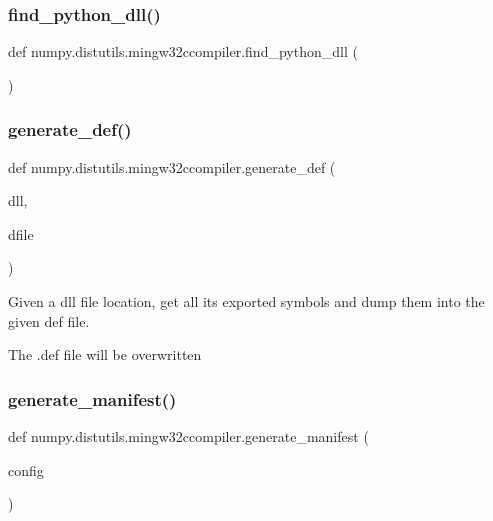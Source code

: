 \subsubsection{\texorpdfstring{find\+\_\+python\+\_\+dll()}{find\_python\_dll()}}
{\footnotesize\ttfamily def numpy.\+distutils.\+mingw32ccompiler.\+find\+\_\+python\+\_\+dll (\begin{DoxyParamCaption}{ }\end{DoxyParamCaption})}

\mbox{\label{namespacenumpy_1_1distutils_1_1mingw32ccompiler_a3ddd00e2fbe0eceeaa6fa2921a6feba0}} 
\subsubsection{\texorpdfstring{generate\+\_\+def()}{generate\_def()}}
{\footnotesize\ttfamily def numpy.\+distutils.\+mingw32ccompiler.\+generate\+\_\+def (\begin{DoxyParamCaption}\item[{}]{dll,  }\item[{}]{dfile }\end{DoxyParamCaption})}

\begin{DoxyVerb}Given a dll file location,  get all its exported symbols and dump them
into the given def file.

The .def file will be overwritten\end{DoxyVerb}
 \mbox{\label{namespacenumpy_1_1distutils_1_1mingw32ccompiler_a3b50b5351a791ceee52c6a52b9f76c5b}} 
\subsubsection{\texorpdfstring{generate\+\_\+manifest()}{generate\_manifest()}}
{\footnotesize\ttfamily def numpy.\+distutils.\+mingw32ccompiler.\+generate\+\_\+manifest (\begin{DoxyParamCaption}\item[{}]{config }\end{DoxyParamCaption})}

